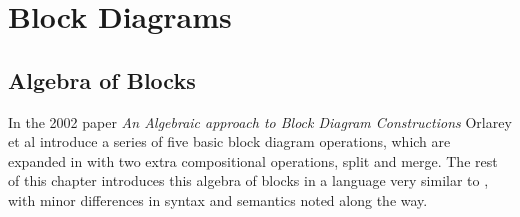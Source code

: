 \newcommand{\Ident}{\ensuremath{\textrm{ident}}}
\newcommand{\Cut}{\ensuremath{\textrm{cut}}}
\newcommand{\Sequential}{\ensuremath{\textrm{seq}}}
\newcommand{\Parallel}{\ensuremath{\textrm{par}}}
\newcommand{\Recursive}{\ensuremath{\textrm{rec}}}
\newcommand{\Resample}{\ensuremath{\textrm{resample}}}
\newcommand{\Split}{\ensuremath{\textrm{split}}}
\newcommand{\Merge}{\ensuremath{\textrm{merge}}}
\newcommand{\Ins}{\ensuremath{\textbf{ins}}}
\newcommand{\Outs}{\ensuremath{\textbf{outs}}}
\newcommand{\Sig}{\ensuremath{\mathbb{S}}}
\newcommand{\SigP}[1]{\ensuremath{\llbracket #1 \rrbracket}}


\chapter{Block Diagrams}
\label{chap:blocks}

\section{Algebra of Blocks}

In the 2002 paper \emph{An Algebraic approach to Block Diagram Constructions}\autocite{orlarey2002} Orlarey et al introduce a series of five
basic block diagram operations, which are expanded in \autocite{orlarey2004} with two extra compositional
operations, split and merge. The rest of this chapter introduces this algebra of blocks in a language very
similar to \autocite{orlarey2004}, with minor differences in syntax and semantics noted along the way.

